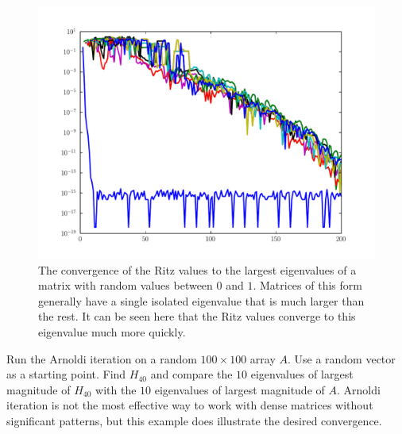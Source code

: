 \begin{figure}
\includegraphics[width=\textwidth]{rand_vals_conv.pdf}
\caption{The convergence of the Ritz values to the largest eigenvalues of a matrix with random values between $0$ and $1$.
Matrices of this form generally have a single isolated eigenvalue that is much larger than the rest.
It can be seen here that the Ritz values converge to this eigenvalue much more quickly.}
\label{fig:arnoldi_random_val_conv}
\end{figure}

\begin{problem}
Run the Arnoldi iteration on a random $100 \times 100$ array $A$.
Use a random vector as a starting point.
Find $H_{40}$ and compare the $10$ eigenvalues of largest magnitude of $H_{40}$ with the $10$ eigenvalues of largest magnitude of $A$.
Arnoldi iteration is not the most effective way to work with dense matrices without significant patterns, but this example does illustrate the desired convergence.
\end{problem}

